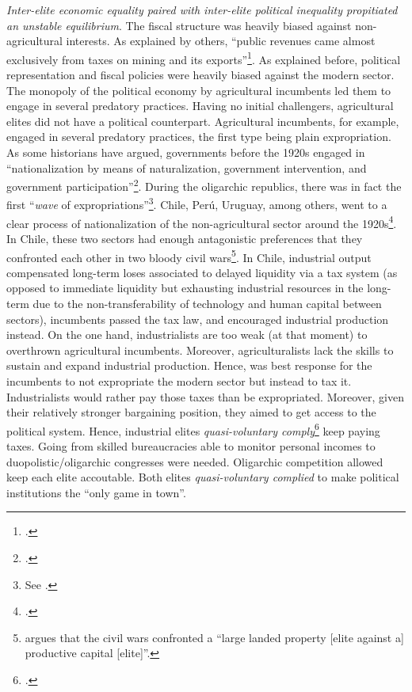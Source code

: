 \documentclass[onesided]{article}\usepackage[]{graphicx}\usepackage[]{color}
\begin{document}
\emph{Inter-elite economic equality paired with inter-elite political inequality propitiated an unstable equilibrium}. The fiscal structure was heavily biased against non-agricultural interests. As explained by others, ``public revenues came almost exclusively from taxes on mining and its exports''\footnote{\citet[p. 38]{Zeitlin:1984aa}.}. As explained before, political representation and fiscal policies were heavily biased against the modern sector. The monopoly of the political economy by agricultural incumbents led them to engage in several predatory practices. Having no initial challengers,  agricultural elites did not have a political counterpart. Agricultural incumbents, for example, engaged in several predatory practices, the first type being plain expropriation. As some historians have argued, governments before the 1920s  engaged in ``nationalization by means of naturalization, government intervention, and government participation''\footnote{\citet[p. 238]{Rippy:1971rz}.}. During the oligarchic republics, there was in fact the first ``\emph{wave} of expropriations''\footnote{See \citet[]{Chang2010}.}. Chile, Per\'u, Uruguay, among others, went to a clear process of nationalization of  the non-agricultural sector around the 1920s\footnote{\citet{Chua2010}.}. In Chile, these two sectors had enough antagonistic preferences that they confronted each other in two bloody civil wars\footnote{
	\citet[p. 23]{Zeitlin:1984aa} argues that the civil wars confronted a ``large landed property [elite against a] productive capital [elite]''.
	}. In Chile, industrial output compensated long-term loses associated to delayed liquidity via a tax system (as opposed to immediate liquidity but exhausting industrial resources in the long-term due to the non-transferability of technology and human capital between sectors), incumbents passed the tax law, and encouraged industrial production instead. On the one hand, industrialists are too weak (at that moment) to overthrown agricultural incumbents. Moreover, agriculturalists lack the skills to sustain and expand industrial production. Hence, was best response for the incumbents to not expropriate the modern sector but instead to tax it. Industrialists would rather pay those taxes than be expropriated. Moreover, given their relatively stronger bargaining position, they aimed to get access to the political system. Hence, industrial elites \emph{quasi-voluntary comply}\footnote{\citet{Levi:1989lq}.} keep paying taxes. Going from skilled bureaucracies able to monitor personal incomes to duopolistic/oligarchic congresses were needed. Oligarchic competition allowed keep each elite accoutable. Both elites \emph{quasi-voluntary complied} to make political institutions the ``only game in town''.
\end{document}

